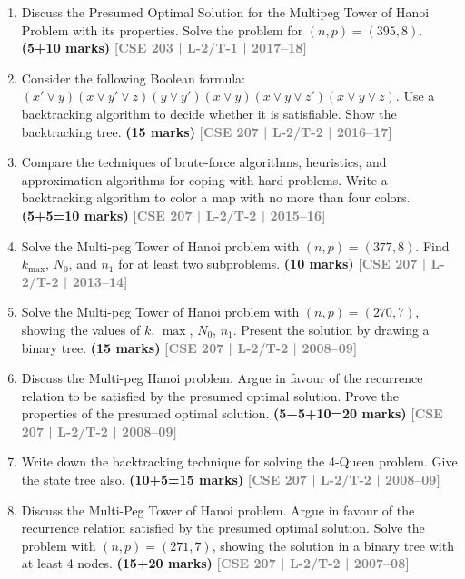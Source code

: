\documentclass[12pt]{article}
\newcommand{\yr}[1]{\hfill\textcolor{gray}{\small\textbf{[#1]}}}
\newcommand{\mk}[1]{\textcolor{orange!70!black}{\small\textbf{(#1 marks)}}}
\begin{document}
\begin{enumerate}
\begin{center}
\end{center}


\item Discuss the Presumed Optimal Solution for the Multipeg Tower of Hanoi Problem with its properties. Solve the problem for $(n, p) = (395, 8)$. \mk{5+10}
\yr{CSE 203 | L-2/T-1 | 2017--18}


\item Consider the following Boolean formula: $(x' \vee y)(x \vee y' \vee z)(y \vee y')(x \vee y)(x \vee y \vee z')(x \vee y \vee z)$. Use a backtracking algorithm to decide whether it is satisfiable. Show the backtracking tree. \mk{15}
\yr{CSE 207 | L-2/T-2 | 2016--17}



\item Compare the techniques of brute-force algorithms, heuristics, and approximation algorithms for coping with hard problems. Write a backtracking algorithm to color a map with no more than four colors. \mk{5+5=10}
\yr{CSE 207 | L-2/T-2 | 2015--16}


\item Solve the Multi-peg Tower of Hanoi problem with $(n, p) = (377, 8)$. Find $k_{\max}$, $N_0$, and $n_1$ for at least two subproblems. \mk{10}
\yr{CSE 207 | L-2/T-2 | 2013--14}

\item Solve the Multi-peg Tower of Hanoi problem with $(n, p) = (270, 7)$, showing the values of $k$, $\max$, $N_0$, $n_1$. Present the solution by drawing a binary tree. \mk{15}
\yr{CSE 207 | L-2/T-2 | 2008--09}


\item Discuss the Multi-peg Hanoi problem. Argue in favour of the recurrence relation to be satisfied by the presumed optimal solution. Prove the properties of the presumed optimal solution. \mk{5+5+10=20}
\yr{CSE 207 | L-2/T-2 | 2008--09}

\item Write down the backtracking technique for solving the 4-Queen problem. Give the state tree also. \mk{10+5=15}
\yr{CSE 207 | L-2/T-2 | 2008--09}


\item Discuss the Multi-Peg Tower of Hanoi problem. Argue in favour of the recurrence relation satisfied by the presumed optimal solution. Solve the problem with $(n, p) = (271, 7)$, showing the solution in a binary tree with at least 4 nodes. \mk{15+20}
\yr{CSE 207 | L-2/T-2 | 2007--08}



\end{enumerate}
\end{document}
